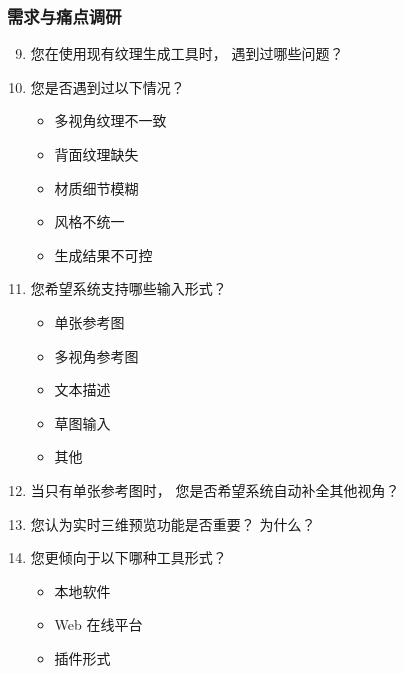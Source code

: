 {    \vspace{0.3em}

    \subsubsection{需求与痛点调研}

    \begin{enumerate}
        \setcounter{enumi}{8}
        \setlength{\itemsep}{0pt}
        \setlength{\parskip}{0pt}

        \item 您在使用现有纹理生成工具时，
        遇到过哪些问题？

        \item 您是否遇到过以下情况？
        \begin{itemize}
            \setlength{\itemsep}{0pt}
            \item 多视角纹理不一致
            \item 背面纹理缺失
            \item 材质细节模糊
            \item 风格不统一
            \item 生成结果不可控
        \end{itemize}

        \item 您希望系统支持哪些输入形式？
        \begin{itemize}
            \setlength{\itemsep}{0pt}
            \item 单张参考图
            \item 多视角参考图
            \item 文本描述
            \item 草图输入
            \item 其他
        \end{itemize}

        \item 当只有单张参考图时，
        您是否希望系统自动补全其他视角？

        \item 您认为实时三维预览功能是否重要？
        为什么？

        \item 您更倾向于以下哪种工具形式？
        \begin{itemize}
            \setlength{\itemsep}{0pt}
            \item 本地软件
            \item Web 在线平台
            \item 插件形式
        \end{itemize}
    \end{enumerate}

}
